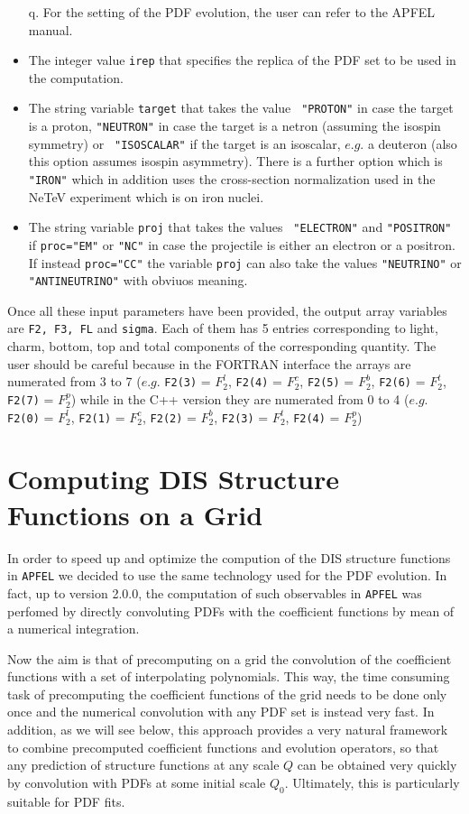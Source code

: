 \documentclass[10pt,a4paper]{article}
\begin{document}
\begin{itemize}
{    q}. For the setting of the PDF evolution, the user can refer to
  the APFEL manual.
\item The integer value {\tt irep} that specifies the replica of the PDF
  set to be used in the computation.
\item The string variable {\tt target} that takes the value {\tt
    "PROTON"} in case the target is a proton, {\tt "NEUTRON"} in case
  the target is a netron (assuming the isospin symmetry) or {\tt
    "ISOSCALAR"} if the target is an isoscalar, $e.g.$ a
  deuteron (also this option assumes isospin asymmetry). There is a
  further option which is {\tt "IRON"} which in addition uses the cross-section
  normalization used in the NeTeV experiment which is on iron nuclei.
\item The string variable {\tt proj} that takes the values {\tt
    "ELECTRON"} and {\tt "POSITRON"} if {\tt proc="EM"} or {\tt "NC"}
  in case the projectile is either an electron or a positron. If
  instead {\tt proc="CC"} the variable {\tt proj} can also take the
  values {\tt "NEUTRINO"} or {\tt "ANTINEUTRINO"} with obviuos meaning.
\end{itemize}

Once all these input parameters have been provided, the output
array variables are {\tt F2, F3, FL} and {\tt sigma}. Each of them has
5 entries corresponding to light, charm, bottom, top and total
components of the corresponding quantity.
The user should be careful because in the FORTRAN interface the arrays
are numerated from 3 to 7 ($e.g.$ {\tt F2(3)} = $F_2^l$, {\tt F2(4)} =
$F_2^c$, {\tt F2(5)} = $F_2^b$, {\tt F2(6)} = $F_2^t$, {\tt F2(7)} =
$F_2^p$) while in the C++ version they are numerated from 0 to 4 ($e.g.$ {\tt F2(0)} = $F_2^l$, {\tt F2(1)} =
$F_2^c$, {\tt F2(2)} = $F_2^b$, {\tt F2(3)} = $F_2^t$, {\tt F2(4)} =
$F_2^p$)


\section{Computing DIS Structure Functions on a Grid}

In order to speed up and optimize the compution of the DIS structure
functions in {\tt APFEL} we decided to use the same technology used
for the PDF evolution. In fact, up to version 2.0.0, the computation
of such observables in {\tt APFEL} was perfomed by directly
convoluting PDFs with the coefficient functions by mean of a
numerical integration.

Now the aim is that of precomputing on a grid the convolution of the
coefficient functions with a set of interpolating polynomials. This
way, the time consuming task of precomputing the coefficient functions
of the grid needs to be done only once and the numerical convolution
with any PDF set is instead very fast. In addition, as we will see
below, this approach provides a very natural framework to combine
precomputed coefficient functions and evolution operators, so that any
prediction of structure functions at any scale $Q$ can be obtained
very quickly by convolution with PDFs at some initial scale $Q_0$. 
Ultimately, this is particularly suitable for PDF fits.
\end{document}
